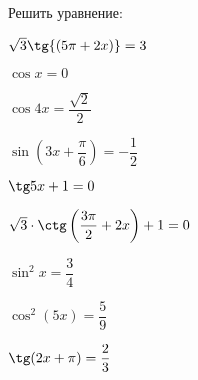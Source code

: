 \begin{listofex}
	\item Решить уравнение:
	\begin{enumcols}[itemcolumns=3]
		\item \( \sqrt{3}\tg{(5\pi + 2x)} = 3 \)
		\item \( \cos x = 0 \)
		\item \( \cos 4x = \dfrac{\sqrt{2}}{2} \)
		\item \( \sin \left( 3x+\dfrac{\pi}{6} \right)=-\dfrac{1}{2} \)
		\item \( \tg5x+1=0 \)
		\item \( \sqrt{3}\cdot\ctg\left( \dfrac{3\pi}{2}+2x \right)+1=0 \)
		\item \( \sin^2 x = \dfrac{3}{4} \)
		\item \( \cos^2(5x)=\dfrac{5}{9} \)
		\item \( \tg(2x+\pi)=\dfrac{2}{3} \)
	\end{enumcols}
	\item {}
	\item {}
	\item {}
	\item {}
	\item {}
	\item {}
	\item {}
	\item {}
\end{listofex}
